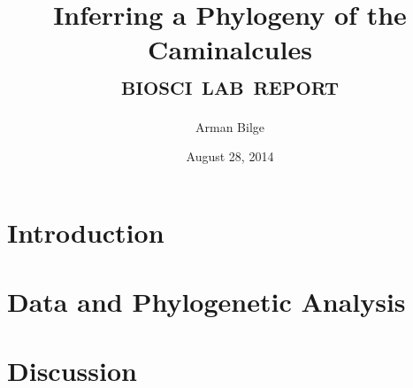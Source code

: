 \documentclass{article}
\title{Inferring a Phylogeny of the Caminalcules \\
       \Large\textsc{biosci \oldstylenums{210} lab report}}
\author{Arman Bilge}
\date{August 28, 2014}
\begin{document}
    \maketitle

    \section*{Introduction}

    \section*{Data and Phylogenetic Analysis}

    \section*{Discussion}

    \printbibliography
\end{document}
